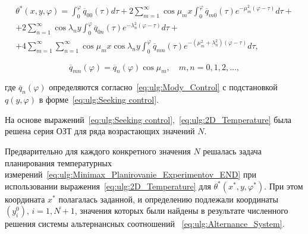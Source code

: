 \begin{multline}\label{eq:ulg:2D_Temperature}

\theta ^*(x,y,\varphi ) = \int _0^\varphi  {\overline q }_{00}(\tau )d\tau  + 

2\sum\limits_{m = 1}^\infty  \cos  {\mu _m}x  \int _0^\varphi  {{\overline q }_{m0}(\tau ){e^{ - \mu _m^2(\varphi  - \tau )}}d\tau } + 

\\

+ 2\sum\limits_{n = 1}^\infty  \cos  \lambda _n y  \int _0^\varphi  {{\overline q }_{0n}}(\tau ){e^{ - \lambda _n^2(\varphi  - \tau )}}d\tau   +

\\

+ 4\sum\limits_{m = 1}^\infty  \sum\limits_{n = 1}^\infty  

\cos \mu _m x  \cos  \lambda _n y   \int _0^\varphi  {\overline q }_{mn}(\tau ){e^{ - (\mu _m^2 + \lambda _n^2)(\varphi  - \tau )}}d\tau ,

\end{multline}



\begin{equation}\label{eq:ulg:q_MN}

{\overline q _{mn}}(\varphi ) = {\overline q _n}(\varphi )\cos \mu_m,\quad m, n = 0, 1, 2, \dots,

\end{equation}

где  $ {\overline q _{n}}(\varphi )$ определяются согласно~\eqref{eq:ulg:Mody_Control} с подстановкой  $ q(y,\varphi ) $ в форме~\eqref{eq:ulg:Seeking control}.



На основе выражений~\eqref{eq:ulg:Seeking control},~\eqref{eq:ulg:2D_Temperature} была решена серия ОЗТ для ряда возрастающих значений  $ N $.



Предварительно для каждого конкретного значения $ N $  решалась задача планирования температурных измерений~\eqref{eq:ulg:Minimax_Planirovanie_Experimentov_END} при использовании  выражения~\eqref{eq:ulg:2D_Temperature} для $ \theta ^*(x^*,y,\varphi ^*) $. При этом координата  $ x^* $ полагалась заданной, и определению подлежали координаты  $(y_i^0),\,i = \overline {1,N + 1} $, значения которых были найдены в результате численного решения системы альтернансных соотношений ~\eqref{eq:ulg:Alternance_System}.



